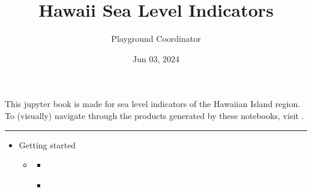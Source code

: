 \documentclass[letterpaper,10pt,english]{jupyterBook}
\title{Hawaii Sea Level Indicators}
\date{Jun 03, 2024}
\author{Playground Coordinator}
\begin{document}
\pagestyle{empty}
\sphinxmaketitle
\pagestyle{plain}
\sphinxtableofcontents
\pagestyle{normal}
\label{\detokenize{intro::doc}}


\sphinxAtStartPar
This jupyter book is made for sea level indicators of the Hawaiian Island region.
To (visually) navigate through the products generated by these notebooks, visit .


\bigskip\hrule\bigskip

\label{\detokenize{intro:table-of-contents}}
\begin{DUlineblock}{0em}
\item[] 
\end{DUlineblock}
\begin{itemize}
\item {} 
\sphinxAtStartPar
Getting started

\begin{itemize}
\item {} 
\sphinxAtStartPar
{\hyperref[\detokenize{gettingStarted::doc}]{}}
\begin{itemize}
\item {} 
\sphinxAtStartPar
{\hyperref[\detokenize{notebooks/setup::doc}]{}}

\item {} 
\sphinxAtStartPar
{\hyperref[\detokenize{notebooks/SL_Data_Wrangling::doc}]{}}

\end{itemize}

\end{itemize}
\end{itemize}
\end{document}
